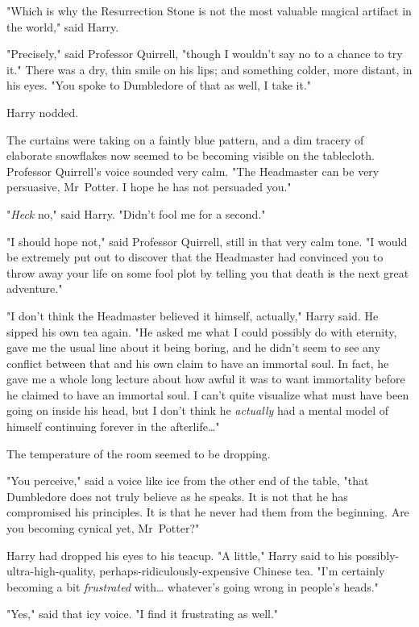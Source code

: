 "Which is why the Resurrection Stone is not the most valuable magical artifact
in the world," said Harry.

"Precisely," said Professor Quirrell, "though I wouldn't say no to a chance to
try it." There was a dry, thin smile on his lips; and something colder, more
distant, in his eyes. "You spoke to Dumbledore of that as well, I take it."

Harry nodded.

The curtains were taking on a faintly blue pattern, and a dim tracery of
elaborate snowflakes now seemed to be becoming visible on the tablecloth.
Professor Quirrell's voice sounded very calm. "The Headmaster can be very
persuasive, Mr~Potter. I hope he has not persuaded you."

"\emph{Heck} no," said Harry. "Didn't fool me for a second."

"I should hope not," said Professor Quirrell, still in that very calm tone. "I
would be extremely put out to discover that the Headmaster had convinced you to
throw away your life on some fool plot by telling you that death is the next
great adventure."

"I don't think the Headmaster believed it himself, actually," Harry said. He
sipped his own tea again. "He asked me what I could possibly do with eternity,
gave me the usual line about it being boring, and he didn't seem to see any
conflict between that and his own claim to have an immortal soul. In fact, he
gave me a whole long lecture about how awful it was to want immortality before
he claimed to have an immortal soul. I can't quite visualize what must have
been going on inside his head, but I don't think he \emph{actually} had a
mental model of himself continuing forever in the afterlife{\ldots}"

The temperature of the room seemed to be dropping.

"You perceive," said a voice like ice from the other end of the table, "that
Dumbledore does not truly believe as he speaks. It is not that he has
compromised his principles. It is that he never had them from the beginning.
Are you becoming cynical yet, Mr~Potter?"

Harry had dropped his eyes to his teacup. "A little," Harry said to his
possibly-ultra-high-quality, perhaps-ridiculously-expensive Chinese tea. "I'm
certainly becoming a bit \emph{frustrated} with{\ldots} whatever's going wrong
in people's heads."

"Yes," said that icy voice. "I find it frustrating as well."

